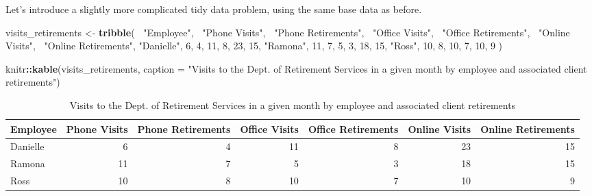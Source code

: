 \documentclass[]{book}
\newenvironment{Shaded}{\begin{snugshade}}{\end{snugshade}}
\newcommand{\KeywordTok}[1]{\textcolor[rgb]{0.13,0.29,0.53}{\textbf{#1}}}
\newcommand{\DataTypeTok}[1]{\textcolor[rgb]{0.13,0.29,0.53}{#1}}
\newcommand{\DecValTok}[1]{\textcolor[rgb]{0.00,0.00,0.81}{#1}}
\newcommand{\StringTok}[1]{\textcolor[rgb]{0.31,0.60,0.02}{#1}}
\newcommand{\OperatorTok}[1]{\textcolor[rgb]{0.81,0.36,0.00}{\textbf{#1}}}
\newcommand{\NormalTok}[1]{#1}
\begin{document}
Let's introduce a slightly more complicated tidy data problem, using the
same base data as before.

\begin{Shaded}
\begin{Highlighting}[]
\NormalTok{visits_retirements <-}\StringTok{ }\KeywordTok{tribble}\NormalTok{(}
  \OperatorTok{~}\StringTok{"Employee"}\NormalTok{, }\OperatorTok{~}\StringTok{"Phone Visits"}\NormalTok{, }\OperatorTok{~}\StringTok{"Phone Retirements"}\NormalTok{, }\OperatorTok{~}\StringTok{"Office Visits"}\NormalTok{, }\OperatorTok{~}\StringTok{"Office Retirements"}\NormalTok{, }\OperatorTok{~}\StringTok{"Online Visits"}\NormalTok{, }\OperatorTok{~}\StringTok{"Online Retirements"}\NormalTok{,}
  \StringTok{"Danielle"}\NormalTok{, }\DecValTok{6}\NormalTok{, }\DecValTok{4}\NormalTok{, }\DecValTok{11}\NormalTok{, }\DecValTok{8}\NormalTok{, }\DecValTok{23}\NormalTok{, }\DecValTok{15}\NormalTok{,}
  \StringTok{"Ramona"}\NormalTok{, }\DecValTok{11}\NormalTok{, }\DecValTok{7}\NormalTok{, }\DecValTok{5}\NormalTok{, }\DecValTok{3}\NormalTok{, }\DecValTok{18}\NormalTok{, }\DecValTok{15}\NormalTok{,}
  \StringTok{"Ross"}\NormalTok{, }\DecValTok{10}\NormalTok{, }\DecValTok{8}\NormalTok{, }\DecValTok{10}\NormalTok{, }\DecValTok{7}\NormalTok{, }\DecValTok{10}\NormalTok{, }\DecValTok{9} 
\NormalTok{)}

\NormalTok{knitr}\OperatorTok{::}\KeywordTok{kable}\NormalTok{(visits_retirements, }\DataTypeTok{caption =} \StringTok{"Visits to the Dept. of Retirement Services in a given month by employee and associated client retirements"}\NormalTok{)}
\end{Highlighting}
\end{Shaded}

\begin{table}

\caption{\label{tab:unnamed-chunk-5}Visits to the Dept. of Retirement Services in a given month by employee and associated client retirements}
\centering
\begin{tabular}[t]{l|r|r|r|r|r|r}
\hline
Employee & Phone Visits & Phone Retirements & Office Visits & Office Retirements & Online Visits & Online Retirements\\
\hline
Danielle & 6 & 4 & 11 & 8 & 23 & 15\\
\hline
Ramona & 11 & 7 & 5 & 3 & 18 & 15\\
\hline
Ross & 10 & 8 & 10 & 7 & 10 & 9\\
\hline
\end{tabular}
\end{table}
\end{document}
